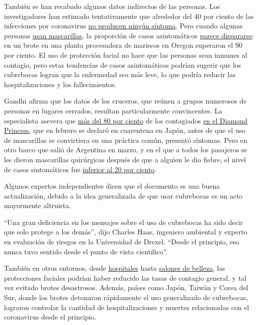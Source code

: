 También se han recabado algunos datos indirectos de las personas. Los
investigadores han estimado tentativamente que alrededor del 40 por
ciento de las infecciones por coronavirus
\href{https://www.cdc.gov/coronavirus/2019-ncov/hcp/planning-scenarios.html}{no
producen ningún síntoma}. Pero cuando algunas personas
\href{https://www.oregonlive.com/coronavirus/2020/06/big-coronavirus-outbreak-at-newport-seafood-plants-is-contained-health-authorities-say.html}{usan
mascarillas}, la proporción de casos asintomáticos
\href{https://apnews.com/4b9d38f206db9ce5267a5898ac24f238}{parece
dispararse}: en un brote en una planta procesadora de mariscos en Oregon
superaron el 90 por ciento. El uso de protección facial no hace que las
personas sean inmunes al contagio, pero estas tendencias de casos
asintomáticos podrían sugerir que los cubrebocas logran que la
enfermedad sea más leve, lo que podría reducir las hospitalizaciones y
los fallecimientos.

Gandhi afirma que los datos de los cruceros, que reúnen a grupos
numerosos de personas en lugares cerrados, resultan particularmente
convincentes. La especialista asevera que
\href{https://www.ncbi.nlm.nih.gov/pmc/articles/PMC7078829/}{más del 80
por ciento} de los contagiados
\href{https://www.nytimes3xbfgragh.onion/es/2020/03/10/espanol/mundo/coronavirus-crucero.html}{en
el Diamond Princess,} que en febrero se declaró en cuarentena en Japón,
antes de que el uso de mascarillas se convirtiera en una práctica común,
presentó síntomas. Pero en otro barco que salió de Argentina en marzo, y
en el que a todos los pasajeros se les dieron mascarillas quirúrgicas
después de que a alguien le dio fiebre, el nivel de casos sintomáticos
fue \href{https://thorax.bmj.com/content/75/8/693}{inferior al 20 por
ciento}.

Algunos expertos independientes dicen que el documento es una buena
actualización, debido a la idea generalizada de que usar cubrebocas es
un acto mayormente altruista.

``Una gran deficiencia en los mensajes sobre el uso de cubrebocas ha
sido decir que solo protege a los demás'', dijo Charles Haas, ingeniero
ambiental y experto en evaluación de riesgos en la Universidad de
Drexel. ``Desde el principio, eso nunca tuvo sentido desde el punto de
vista científico''.

También en otros entornos, desde
\href{https://jamanetwork.com/journals/jama/fullarticle/2768533}{hospitales}
hasta
\href{https://www.nytimes3xbfgragh.onion/2020/07/14/health/coronavirus-hair-salon-masks.html}{salones
de belleza}, las protecciones faciales podrían haber reducido las tasas
de contagio general, y tal vez evitado brotes desastrosos. Además,
países como Japón, Taiwán y Corea del Sur, donde los brotes detonaron
rápidamente el uso generalizado de cubrebocas, lograron controlar la
cantidad de hospitalizaciones y muertes relacionadas con el coronavirus
desde el principio.

